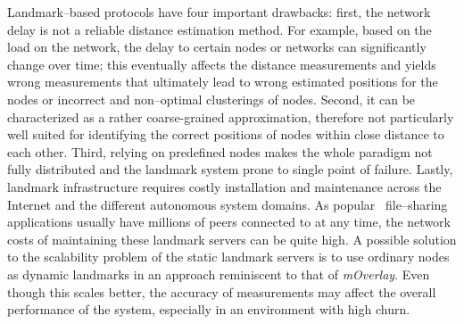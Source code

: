 Landmark--based protocols have four important drawbacks:
first, the network delay is not a reliable distance estimation method. For
example, based on the load on the network, the delay to certain nodes or
networks can significantly change over time; this eventually affects the
distance measurements and yields wrong measurements that ultimately lead to
wrong estimated positions for the nodes or incorrect and non--optimal
clusterings of nodes.
Second, it can be characterized as a rather coarse-grained approximation,
therefore not particularly well suited for identifying the correct positions
of nodes within close distance to each other.
Third, relying on predefined nodes makes the whole paradigm not fully
distributed and the landmark system prone to single point of failure.
Lastly, landmark infrastructure requires costly installation and maintenance 
across the Internet and the different autonomous system domains. As popular
\p\ file--sharing applications usually have millions of peers connected to at
any time, the network costs of maintaining these landmark servers can be quite
high. A possible solution to the scalability problem of the static landmark
servers is to use ordinary nodes as dynamic landmarks in an approach
reminiscent to that of \emph{mOverlay}. Even though this scales better, the
accuracy of measurements may affect the overall performance of the system,
especially in an environment with high churn.
%


